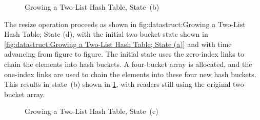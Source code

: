 \begin{figure}[tb]
\centering
{}
\caption{Growing a Two-List Hash Table, State~(b)}
\label{fig:datastruct:Growing a Two-List Hash Table; State (b)}
\end{figure}

The resize operation proceeds as shown in
{fig:datastruct:Growing a Two-List Hash Table; State (d)},
with the initial two-bucket state shown in
\cref{fig:datastruct:Growing a Two-List Hash Table; State (a)}
and with time advancing from figure to figure.
The initial state uses the zero-index links to chain the elements into
hash buckets.
A four-bucket array is allocated, and the one-index links are used to
chain the elements into these four new hash buckets.
This results in state~(b) shown in
\cref{fig:datastruct:Growing a Two-List Hash Table; State (b)},
with readers still using the original two-bucket array.

\begin{figure}[tb]
\centering
{}
\caption{Growing a Two-List Hash Table, State~(c)}
\label{fig:datastruct:Growing a Two-List Hash Table; State (c)}
\end{figure}

